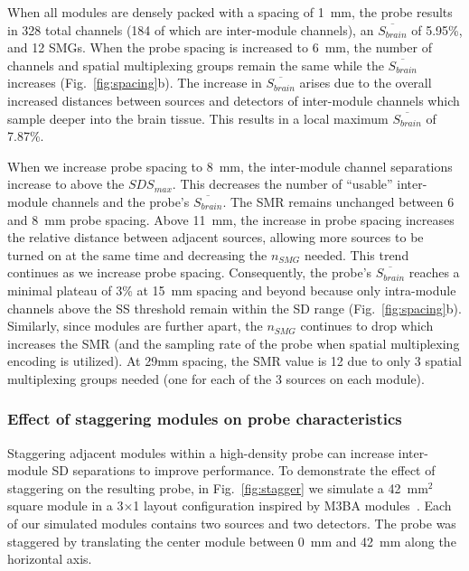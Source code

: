 When all modules are densely packed with a spacing of 1~mm, the probe results in 328 total channels (184 of which are inter-module channels), an $\overline{S_{brain}}$ of 5.95\%, and 12 \ac{SMG}s. When the probe spacing is increased to 6~mm, the number of channels and spatial multiplexing groups remain the same while the $\overline{S_{brain}}$ increases (Fig.~\ref{fig:spacing}b). The increase in $\overline{S_{brain}}$ arises due to the overall increased distances between sources and detectors of inter-module channels which sample deeper into the brain tissue. This results in a local maximum $\overline{S_{brain}}$ of 7.87\%. 

When we increase probe spacing to 8~mm, the inter-module channel separations increase to above the $SDS_{max}$. This decreases the number of ``usable'' inter-module channels and the probe's $\overline{S_{brain}}$. The \ac{SMR} remains unchanged between 6 and 8~mm probe spacing. Above 11~mm, the increase in probe spacing increases the relative distance between adjacent sources, allowing more sources to be turned on at the same time and decreasing the $n_{SMG}$ needed. This trend continues as we increase probe spacing. Consequently, the probe's $\overline{S_{brain}}$ reaches a minimal plateau of 3\% at 15~mm spacing and beyond because only intra-module channels above the \ac{SS} threshold remain within the \ac{SD} range (Fig.~\ref{fig:spacing}b). Similarly, since modules are further apart, the $n_{SMG}$ continues to drop which increases the \ac{SMR} (and the sampling rate of the probe when spatial multiplexing encoding is utilized). At 29mm spacing, the \ac{SMR} value is 12 due to only 3 spatial multiplexing groups needed (one for each of the 3 sources on each module).

\subsubsection{Effect of staggering modules on probe characteristics}
Staggering adjacent modules within a high-density probe can increase inter-module \ac{SD} separations to improve performance. To demonstrate the effect of staggering on the resulting probe, in Fig.~\ref{fig:stagger} we simulate a 42~$\textrm{mm}^2$ square module in a 3$\times$1 layout configuration inspired by M3BA modules~\cite{Bci2017}. Each of our simulated modules contains two sources and two detectors. The probe was staggered by translating the center module between 0~mm and 42~mm along the horizontal axis.

